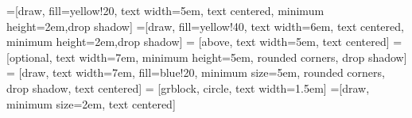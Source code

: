 
\theoremstyle{plain}
\newtheorem{definition}[subsection]{Definition}    %

\newtheorem{example}{Ejemplo}										 %

\newtheorem{theorem}{Teorema}											 %

\newtheorem*{proofa}{Prueba}

\hypersetup{urlcolor=blue}			 %

\newcommand{\fn}[1]{\texttt{#1}}						%
\newcommand{\cn}[1]{\texttt{\char92 #1}}
\newcommand{\gnuradio}{\emph{GNURadio }}


\makeatletter
\providecommand*{\toclevel@extrachapter}{0}
\makeatother

\lstset{language=Python,basicstyle=\footnotesize\sffamily,captionpos=b,showstringspaces=false,frame=single}
\renewcommand{\lstlistingname}{Listado}
\renewcommand{\lstlistlistingname}{\'Indice de listados}

=[draw, fill=yellow!20, text width=5em, 
    text centered, minimum height=2em,drop shadow]
=[draw, fill=yellow!40, text width=6em, 
text centered, minimum height=2em,drop shadow]
 = [above, text width=5em, text centered]
 = [optional, text width=7em, 
    minimum height=5em, rounded corners, drop shadow]
 = [draw, text width=7em, fill=blue!20, 
    minimum size=5em, rounded corners, drop shadow, text centered]
 = [grblock, circle, text width=1.5em]
=[draw, minimum size=2em, text centered]
    
\def\antenna{-- +(0mm,4.0mm) -- +(2.625mm,7.5mm) -- +(-2.625mm,7.5mm) -- +(0mm,4.0mm)}

\def\filterLP{\node{};
	\draw[line width=1pt] (-6mm, -5mm) to (-6mm, 5mm)
						  (-6mm, -5mm) to (6mm,-5mm)
						  (-6mm, 3mm) to (-1mm, 3mm) arc (90:25:0.2cm) --
						  +(4mm, -7mm);
						  
}

